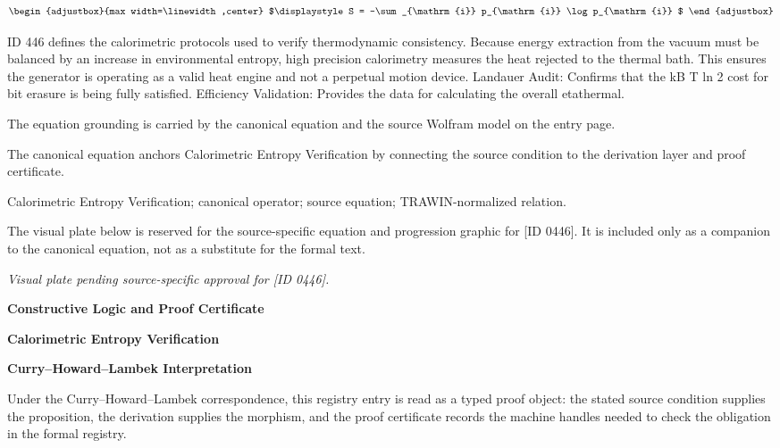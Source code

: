 \[
\begin{adjustbox}{max width=\linewidth,center}
$\displaystyle
S = -\sum_{\mathrm{i}} p_{\mathrm{i}} \log p_{\mathrm{i}}
$
\end{adjustbox}
\]

ID 446 defines the calorimetric protocols used to verify thermodynamic consistency. Because energy extraction from the vacuum must be balanced by an increase in environmental entropy, high precision calorimetry measures the heat rejected to the thermal bath. This ensures the generator is operating as a valid heat engine and not a perpetual motion device. Landauer Audit: Confirms that the kB T ln 2 cost for bit erasure is being fully satisfied. Efficiency Validation: Provides the data for calculating the overall etathermal.

The equation grounding is carried by the canonical equation and the source Wolfram model on the entry page.

The canonical equation anchors Calorimetric Entropy Verification by connecting the source condition to the derivation layer and proof certificate.

Calorimetric Entropy Verification; canonical operator; source equation; TRAWIN-normalized relation.
\endgroup

\begingroup\footnotesize\sloppy
The visual plate below is reserved for the source-specific equation and progression graphic for [ID 0446]. It is included only as a companion to the canonical equation, not as a substitute for the formal text.
\par\endgroup
\begingroup\footnotesize\itshape
Visual plate pending source-specific approval for [ID 0446].
\par\endgroup

\clearpage
\begingroup\tzpsupportsetup
\noindent\textbf{\fontsize{10.8pt}{12.8pt}\selectfont [ID 0446] Constructive Logic and Proof Certificate}\par
\noindent\textbf{\fontsize{10pt}{12pt}\selectfont Calorimetric Entropy Verification}\par
\vspace{0.45em}
\begingroup
\footnotesize
\setlength{\parskip}{0.22em}
\setlength{\parindent}{0pt}
\noindent\textbf{Curry--Howard--Lambek Interpretation}\par
Under the Curry--Howard--Lambek correspondence, this registry entry is read as a typed proof
object: the stated source condition supplies the proposition, the derivation supplies the
morphism, and the proof certificate records the machine handles needed to check the obligation
in the formal registry.

